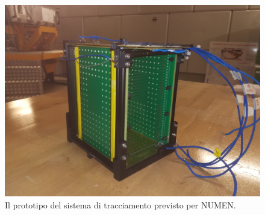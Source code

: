 \begin{figure} [!p]
	\centering
	\includegraphics[width=\textwidth, keepaspectratio]{Grafici/castelletto3.jpg}
	\caption{Il prototipo del sistema di tracciamento previsto per NUMEN.} \label{fig:castelletto}
\end{figure}




\section{}




